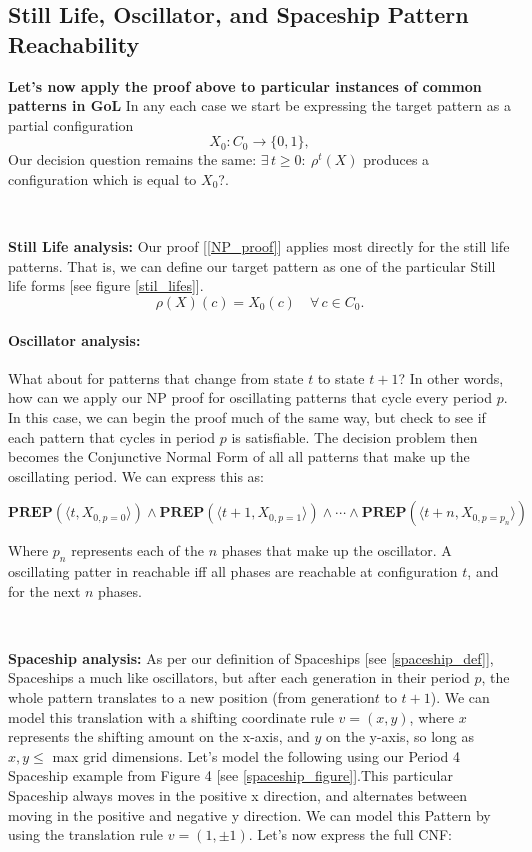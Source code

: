 \documentclass{article}
\theoremstyle{definition}
\theoremstyle{plain}
\theoremstyle{plain}
\begin{document}
\subsection{Still Life, Oscillator, and Spaceship Pattern Reachability}

\textbf{Let's now apply the proof above to particular instances of common patterns in GoL}
In any each case we start be expressing the target pattern as a partial configuration
\begin{equation}
  X_0 \colon C_0 \to \{0,1\},
\end{equation}
Our decision question remains the same: $\exists\,t\ge0:\ \rho^t(X)$ produces a configuration which is equal to $X_0$?.

\
\

\textbf{Still Life analysis:}
Our proof [\ref{NP_proof}] applies most directly for the still life patterns. That is, we can define our target pattern as one of the particular Still life forms [see figure \ref{stil_lifes}]. 
\begin{equation}
  \rho(X)(c) = X_0(c)\quad\forall\,c\in C_0.
\end{equation}

\paragraph{Oscillator analysis:} 
What about for patterns that change from state $t$ to state $t+1$? In other words, how can we apply our NP proof for oscillating patterns that cycle every period $p$. In this case, we can begin the proof much of the same way, but check to see if each pattern that cycles in period $p$ is satisfiable. The decision problem then becomes the Conjunctive Normal Form of all all patterns that make up the oscillating period. We can express this as:


\begin{equation}
\textbf{PREP}(\langle t, X_{0,p=0} \rangle) \land \textbf{PREP}(\langle t+1, X_{0,p=1} \rangle) \land \cdots \land \textbf{PREP}(\langle t+n, X_{0,p=p_n} \rangle)
\end{equation}

Where $p_n$ represents each of the $n$ phases that make up the oscillator. A oscillating patter in reachable iff all phases are reachable at configuration $t$, and for the next $n$ phases.

\
\

\textbf{Spaceship analysis:}
As per our definition of Spaceships [see \ref{spaceship_def}], Spaceships a much like oscillators, but after each generation in their period $p$, the whole pattern translates to a new position (from generation$t$ to $t+1$). We can model this translation with a shifting coordinate rule $v = (x,y)$, where $x$ represents the shifting amount on the x-axis, and $y$ on the y-axis, so long as $x,y \leq$ max grid dimensions. Let's model the following using our Period 4 Spaceship example from Figure 4 [see \ref{spaceship_figure}].This particular Spaceship always moves in the positive x direction, and alternates between moving in the positive and negative y direction. We can model this Pattern by using the translation rule $v = (1,\pm1)$. Let's now express the full CNF:
\end{document}
